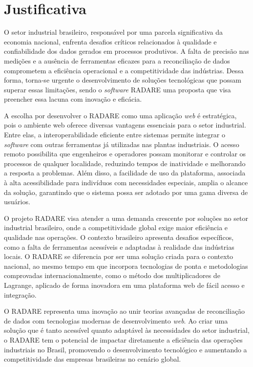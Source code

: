\section{Justificativa}

O setor industrial brasileiro, responsável por uma parcela significativa da economia nacional, enfrenta desafios críticos relacionados à qualidade e confiabilidade dos dados gerados em processos produtivos. A falta de precisão nas medições e a ausência de ferramentas eficazes para a reconciliação de dados comprometem a eficiência operacional e a competitividade das indústrias. Dessa forma, torna-se urgente o desenvolvimento de soluções tecnológicas que possam superar essas limitações, sendo o \textit{software} RADARE uma proposta que visa preencher essa lacuna com inovação e eficácia.

A escolha por desenvolver o RADARE como uma aplicação \textit{web} é estratégica, pois o ambiente web oferece diversas vantagens essenciais para o setor industrial. Entre elas, a interoperabilidade eficiente entre sistemas permite integrar o \textit{software} com outras ferramentas já utilizadas nas plantas industriais. O acesso remoto possibilita que engenheiros e operadores possam monitorar e controlar os processos de qualquer localidade, reduzindo tempos de inatividade e melhorando a resposta a problemas. Além disso, a facilidade de uso da plataforma, associada à alta acessibilidade para indivíduos com necessidades especiais, amplia o alcance da solução, garantindo que o sistema possa ser adotado por uma gama diversa de usuários.

O projeto RADARE visa atender a uma demanda crescente por soluções no setor industrial brasileiro, onde a competitividade global exige maior eficiência e qualidade nas operações. O contexto brasileiro apresenta desafios específicos, como a falta de ferramentas acessíveis e adaptadas à realidade das indústrias locais. O RADARE se diferencia por ser uma solução criada para o contexto nacional, ao mesmo tempo em que incorpora tecnologias de ponta e metodologias comprovadas internacionalmente, como o método dos multiplicadores de Lagrange, aplicado de forma inovadora em uma plataforma web de fácil acesso e integração.

O RADARE representa uma inovação ao unir teorias avançadas de reconciliação de dados com tecnologias modernas de desenvolvimento \textit{web}. Ao criar uma solução que é tanto acessível quanto adaptável às necessidades do setor industrial, o RADARE tem o potencial de impactar diretamente a eficiência das operações industriais no Brasil, promovendo o desenvolvimento tecnológico e aumentando a competitividade das empresas brasileiras no cenário global.

